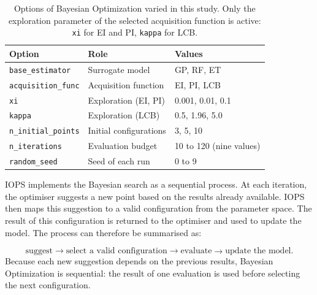 \begin{table}[H]
\centering
\caption{Options of Bayesian Optimization varied in this study. Only the
exploration parameter of the selected acquisition function is active:
\texttt{xi} for EI and PI, \texttt{kappa} for LCB.}
\label{tab:bo-values}
\begin{tabular}{lll}
    \hline
    \rowcolor{gray!30}
    \textbf{Option} & \textbf{Role} & \textbf{Values} \\
    \hline
    \texttt{base\_estimator} & Surrogate model & GP, RF, ET \\
    \texttt{acquisition\_func} & Acquisition function & EI, PI, LCB \\
    \texttt{xi} & Exploration (EI, PI) & 0.001, 0.01, 0.1 \\
    \texttt{kappa} & Exploration (LCB) & 0.5, 1.96, 5.0 \\
    \texttt{n\_initial\_points} & Initial configurations & 3, 5, 10 \\
    \texttt{n\_iterations} & Evaluation budget & 10 to 120 (nine values) \\
    \texttt{random\_seed} & Seed of each run & 0 to 9 \\
    \hline
\end{tabular}
\end{table}

IOPS implements the Bayesian search as a sequential process. At each
iteration, the optimiser suggests a new point based on the results
already available. IOPS then maps this suggestion to a valid
configuration from the parameter space. The result of this configuration
is returned to the optimiser and used to update the model.
The process can therefore be summarised as:

\[
\text{suggest}
\rightarrow
\text{select a valid configuration}
\rightarrow
\text{evaluate}
\rightarrow
\text{update the model}.
\]
Because each new suggestion depends on the previous results, Bayesian
Optimization is sequential: the result of one evaluation is used before
selecting the next configuration.